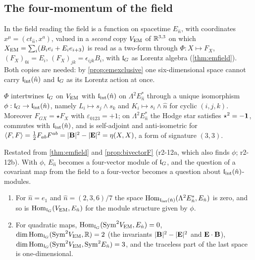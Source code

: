 \subsection{The four-momentum of the field}
\label{r2:sec:field}

In the field reading the field is a function on spacetime $E_{\hat n}$, with coordinates $x^\mu=(ct_{\hat n},x^a)$, valued in a \emph{second} copy $V_{\rm EM}$ of
$\mathbb{R}^{3,3}$ on which $X_{\rm EM}=\sum_i(B_ie_i+E_ie_{i+3})$ is read as a two-form through $\Phi:X\mapsto F_X$, $(F_X)_{0i}=E_i$, $(F_X)_{jk}=\epsilon_{ijk}B_i$, with
$\mathfrak l_G$ as Lorentz algebra (\cref{thm:emfield}). Both copies are needed: by \cref{prop:emexclusive} one six-dimensional space cannot carry
$\mathfrak l_{\rm int}(\hat n)$ and $\mathfrak l_G$ as its Lorentz action at once.

\begin{proposition}
\label{r2:prop:dict}
$\Phi$ intertwines $\mathfrak l_G$ on $V_{\rm EM}$ with $\mathfrak l_{\rm int}(\hat n)$ on $\Lambda^2E_{\hat n}^*$ through a unique isomorphism $\phi:\mathfrak l_G\to\mathfrak l_{\rm int}(\hat n)$, namely
$L_i\mapsto s_j\wedge s_k$ and $K_i\mapsto s_i\wedge \hat n$ for cyclic $(i,j,k)$. Moreover $F_{GX}=\star F_X$ with $\varepsilon_{0123}=+1$; on $\Lambda^2E_{\hat n}^*$ the
Hodge star satisfies $\star^2=-\mathbf 1$, commutes with $\mathfrak l_{\rm int}(\hat n)$, and is self-adjoint and anti-isometric for $\langle F,F\rangle=\tfrac12F_{ab}F^{ab}=|\mathbf B|^2-|\mathbf E|^2
=\eta(X,X)$, a form of signature $(3,3)$.
\end{proposition}

Restated from \cref{thm:emfield} and \cref{prop:bivectorF} (r2-12a, which also finds $\phi$; r2-12b). With $\phi$, $E_{\hat n}$ becomes a four-vector module of
$\mathfrak l_G$, and the question of a covariant map from the field to a four-vector becomes a question about $\mathfrak l_{\rm int}(\hat n)$-modules.

\begin{proposition}
\label{r2:prop:nolinear}
\begin{enumerate}[label=(\roman*),leftmargin=2.2em]
\item For $\hat n=e_1$ and $\hat n=(2,3,6)/7$ the space $\operatorname{Hom}_{\mathfrak l_{\rm int}(\hat n)}(\Lambda^2E_{\hat n}^*,E_{\hat n})$ is zero, and so is $\operatorname{Hom}_{\mathfrak l_G}(V_{\rm EM},E_{\hat n})$ for the module
structure given by $\phi$.
\item For quadratic maps, $\operatorname{Hom}_{\mathfrak l_G}(\mathrm{Sym}^2V_{\rm EM},E_{\hat n})=0$, $\dim\operatorname{Hom}_{\mathfrak l_G}(\mathrm{Sym}^2V_{\rm EM},\mathbb{R})=2$ (the invariants $|\mathbf B|^2-|\mathbf E|^2$ and
$\mathbf E\cdot\mathbf B$), $\dim\operatorname{Hom}_{\mathfrak l_G}(\mathrm{Sym}^2V_{\rm EM},\mathrm{Sym}^2E_{\hat n})=3$, and the traceless part of the last space is one-dimensional.
\end{enumerate}
\end{proposition}

